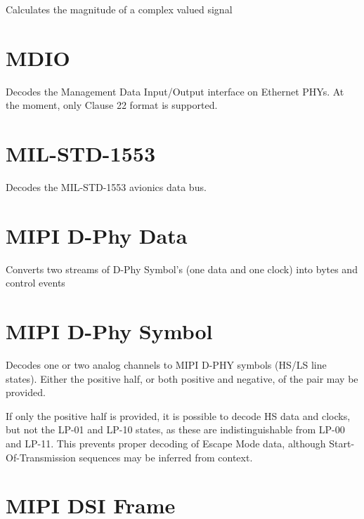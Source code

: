 Calculates the magnitude of a complex valued signal

\pagebreak
\section{MDIO}

Decodes the Management Data Input/Output interface on Ethernet PHYs. At the moment, only Clause 22 format is supported.

\pagebreak
\section{MIL-STD-1553}

Decodes the MIL-STD-1553 avionics data bus.

\pagebreak
\section{MIPI D-Phy Data}

Converts two streams of D-Phy Symbol's (one data and one clock) into bytes and control events

\pagebreak
\section{MIPI D-Phy Symbol}

Decodes one or two analog channels to MIPI D-PHY symbols (HS/LS line states). Either the positive half, or both
positive and negative, of the pair may be provided.

If only the positive half is provided, it is possible to decode HS data and clocks, but not the LP-01 and LP-10 states,
as these are indistinguishable from LP-00 and LP-11. This prevents proper decoding of Escape Mode data, although
Start-Of-Transmission sequences may be inferred from context.

\pagebreak
\section{MIPI DSI Frame}

